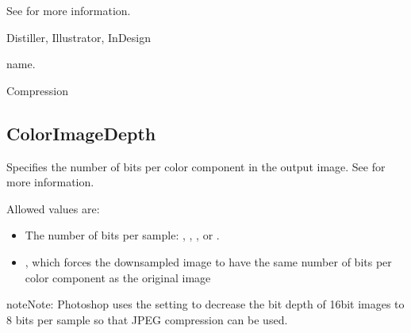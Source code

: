 \documentclass[letterpaper,12pt,english,openany,oneside]{sphinxmanual}
\begin{document}
See  for more information.

\label{\detokenize{PDF_Create_CommonSettings:supported-by-20}}

Distiller, Illustrator, InDesign

\label{\detokenize{PDF_Create_CommonSettings:type-20}}

name.

\label{\detokenize{PDF_Create_CommonSettings:ui-name-15}}

Compression

\label{\detokenize{PDF_Create_CommonSettings:default-value-17}}

\begin{sphinxVerbatim}[commandchars=\\\{\}]
\end{sphinxVerbatim}




\subsection{ColorImageDepth}
\label{\detokenize{PDF_Create_CommonSettings:colorimagedepth}}
Specifies the number of bits per color component in the output image. See  for more information.

Allowed values are:
\begin{itemize}
\item {} 
The number of bits per sample:  ,  ,  , or  .

\item {} 
 , which forces the downsampled image to have the same number of bits per color component as the original image

\end{itemize}

\begin{sphinxadmonition}{note}{Note:}
Photoshop uses the  setting to decrease the bit depth of 16\sphinxhyphen{}bit images to 8 bits per sample so that JPEG compression can be used.
\end{sphinxadmonition}
\label{\detokenize{PDF_Create_CommonSettings:supported-by-21}}
\end{document}
